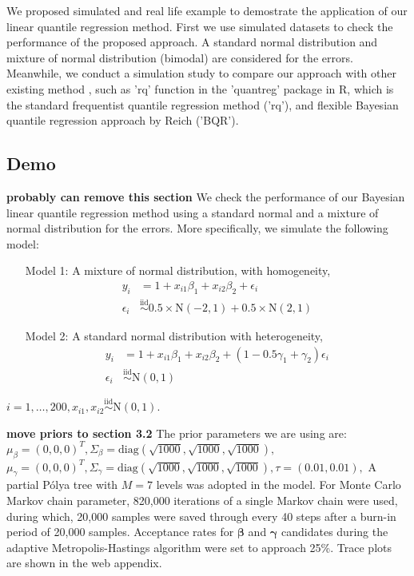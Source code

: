 \documentclass[12pt]{article}
\newcommand{\polya}{P\'{o}lya}
\begin{document}
We proposed simulated and real life example to demostrate the
application of our linear quantile regression method. First we use
simulated datasets to check the performance of the proposed
approach. A standard normal distribution and mixture of normal
distribution (bimodal) are considered for the errors. Meanwhile, we
conduct a simulation study to compare our approach with other existing
method , such as 'rq' function in the 'quantreg' package in R, which
is the standard frequentist quantile regression method ('rq'), and
flexible Bayesian quantile regression approach by Reich ('BQR'). 
\subsection{Demo}
{\bf probably can remove this section}
We check the performance of our Bayesian linear quantile regression
method using a standard normal and a mixture of normal distribution
for the errors. More specifically, we simulate the following model:
\begin{itemize}
\item [Model 1:] A mixture of normal distribution, with homogeneity,
\begin{align*}
y_i &= 1 + x_{i1}\beta_1 + x_{i2}\beta_2 + \epsilon_i\\
\epsilon_i & \stackrel{\text{iid}}{\sim} 0.5 \times \mathrm{N}(-2,1) +
0.5 \times \mathrm{N}(2,1)
\end{align*}
\item [Model 2:] A standard normal distribution with heterogeneity,
\begin{align*}
y_i &= 1 + x_{i1}\beta_1 + x_{i2}\beta_2 + (1-0.5\gamma_1 +
\gamma_{2}) \epsilon_i\\
\epsilon_i & \stackrel{\text{iid}}{\sim}  \mathrm{N}(0,1) 
\end{align*}
\end{itemize}
$i=1, \ldots, 200, x_{i1}, x_{i2} \stackrel{\text{iid}}{\sim}
\mathrm{N}(0,1)$.

{\bf move priors to section 3.2}
The prior parameters we are using are: $\mu_{\beta} = (0,0,0)^T,
\Sigma_{\beta}=\text{diag} (\sqrt{1000},\sqrt{1000},\sqrt{1000}), $ $\mu_{\gamma} = (0,0,0)^T,
\Sigma_{\gamma}=\text{diag} (\sqrt{1000},\sqrt{1000},\sqrt{1000}),
\tau=(0.01, 0.01), $ A partial \polya{} tree with $M=7$ levels was adopted
in the model. For Monte Carlo Markov chain parameter, 820,000
iterations of a single Markov chain were used, during which, 20,000
samples were saved through every 40 steps after a burn-in period of
20,000 samples. Acceptance rates for $\bm{\beta}$ and $\bm{\gamma}$ candidates
during the adaptive Metropolis-Hastings algorithm were set to approach
25\%. Trace plots are shown in the web appendix.
\end{document}
